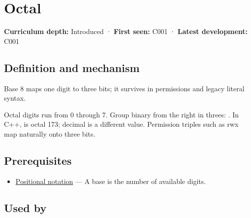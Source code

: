 \hypertarget{appendix-17fc1bc8b305}{}\label{referencestart:appendix-17fc1bc8b305}
\section{Octal}\label{appendix-17fc1bc8b305-octal}

\hypertarget{appendix-17fc1bc8b305-octal}{}

\textbf{Curriculum depth:} Introduced · \textbf{First seen:} C001 · \textbf{Latest development:} C001

\begin{allmightroledefinition}

\subsection{Definition and mechanism}\label{appendix-17fc1bc8b305-definition-and-mechanism}

\hypertarget{appendix-17fc1bc8b305-definition-and-mechanism}{}

Base 8 maps one digit to three bits; it survives in permissions and legacy literal syntax.

\end{allmightroledefinition}

Octal digits run from 0 through 7. Group binary from the right in threes: . In C++,  is octal 173; decimal  is a different value. Permission triples such as rwx map naturally onto three bits.

\subsection{Prerequisites}\label{appendix-17fc1bc8b305-prerequisites}

\hypertarget{appendix-17fc1bc8b305-prerequisites}{}

\begin{itemize}
\tightlist
\item
  \hyperref[appendix-83c3f28f7bda]{Positional notation} --- A base is the number of available digits.
\end{itemize}

\subsection{Used by}\label{appendix-17fc1bc8b305-used-by}

\hypertarget{appendix-17fc1bc8b305-used-by}{}

